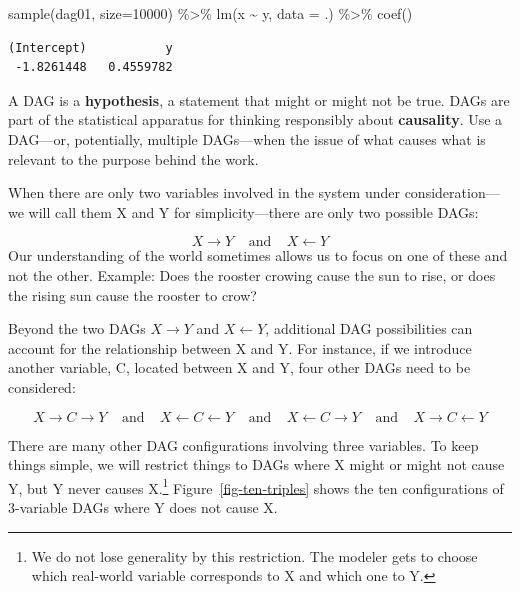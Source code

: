 \documentclass[
  letterpaper,
  DIV=11,
  numbers=noendperiod,
  oneside]{scrreprt}
\newenvironment{Shaded}{\begin{snugshade}}{\end{snugshade}}
\newcommand{\AttributeTok}[1]{\textcolor[rgb]{0.40,0.45,0.13}{#1}}
\newcommand{\DecValTok}[1]{\textcolor[rgb]{0.68,0.00,0.00}{#1}}
\newcommand{\FunctionTok}[1]{\textcolor[rgb]{0.28,0.35,0.67}{#1}}
\newcommand{\NormalTok}[1]{\textcolor[rgb]{0.00,0.23,0.31}{#1}}
\newcommand{\SpecialCharTok}[1]{\textcolor[rgb]{0.37,0.37,0.37}{#1}}
\begin{document}
\begin{Shaded}
\begin{Highlighting}[]
\FunctionTok{sample}\NormalTok{(dag01, }\AttributeTok{size=}\DecValTok{10000}\NormalTok{) }\SpecialCharTok{\%\textgreater{}\%}
  \FunctionTok{lm}\NormalTok{(x }\SpecialCharTok{\textasciitilde{}}\NormalTok{ y, }\AttributeTok{data =}\NormalTok{ .) }\SpecialCharTok{\%\textgreater{}\%}
  \FunctionTok{coef}\NormalTok{()}
\end{Highlighting}
\end{Shaded}

\begin{verbatim}
(Intercept)           y 
 -1.8261448   0.4559782 
\end{verbatim}

A DAG is a \textbf{hypothesis}, a statement that might or might not be
true. DAGs are part of the statistical apparatus for thinking
responsibly about \textbf{causality}. Use a DAG---or, potentially,
multiple DAGs---when the issue of what causes what is relevant to the
purpose behind the work.

When there are only two variables involved in the system under
consideration---we will call them X and Y for simplicity---there are
only two possible DAGs:

\[X \rightarrow Y\ \ \ \ \ \text{and}\ \ \ \ \ X \leftarrow Y\] Our
understanding of the world sometimes allows us to focus on one of these
and not the other. Example: Does the rooster crowing cause the sun to
rise, or does the rising sun cause the rooster to crow?

Beyond the two DAGs \(X \rightarrow Y\) and \(X \leftarrow Y\),
additional DAG possibilities can account for the relationship between X
and Y. For instance, if we introduce another variable, C, located
between X and Y, four other DAGs need to be considered:

\[X \rightarrow C \rightarrow Y \ \ \ \ \ \text{and}\ \ \ \ \
X \leftarrow C \leftarrow Y \ \ \ \ \ \text{and}\ \ \ \ \
X \leftarrow C \rightarrow Y \ \ \ \ \ \text{and}\ \ \ \ \
X \rightarrow C \leftarrow Y\]

There are many other DAG configurations involving three variables. To
keep things simple, we will restrict things to DAGs where X might or
might not cause Y, but Y never causes X.\footnote{We do not lose
  generality by this restriction. The modeler gets to choose which
  real-world variable corresponds to X and which one to Y.}
Figure~\ref{fig-ten-triples} shows the ten configurations of 3-variable
DAGs where Y does not cause X.
\end{document}
